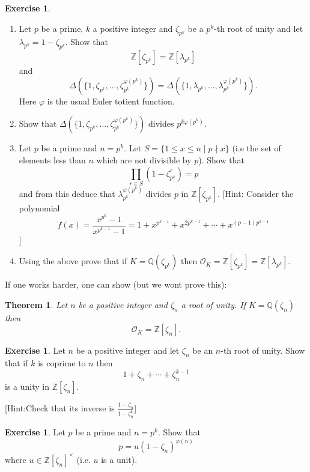 \documentclass[11pt,a4paper]{report}
\theoremstyle{plain}
\newtheorem{thm}[subsection]{Theorem}
\theoremstyle{definition}
\theoremstyle{definition}
\newtheorem{question}[subsection]{Exercise}
\newcommand{\ZZ}{\mathbb{Z}}
\def\QQ{\mathbb{Q}}
\def \lam {\lambda}
\def \OO {\mathcal{O}}
\begin{document}
	\begin{question}
		\begin{enumerate}
			\item 	Let $p$ be a prime, $k$ a positive integer and $\zeta_{p^k}$ be a $p^k$-th root of unity and let $\lam_{p^k}=1-\zeta_{p^k}$. Show that \[\ZZ[\zeta_{p^k}]=\ZZ[\lam_{p^k}] \] and \[\Delta(\{1,\zeta_{p^k},\dots,\zeta_{p^k}^{\varphi(p^k)}\})=\Delta(\{1,\lam_{p^k},\dots,\lam_{p^k}^{\varphi(p^k)}\}).\] Here $\varphi$ is the usual Euler totient function.
			
			\item Show that $\Delta(\{1,\zeta_{p^k},\dots,\zeta_{p^k}^{\varphi(p^k)}\})$ divides $p^{k\varphi(p^k)}$.
			
			\item 		Let $p$ be a prime and $n=p^k$. Let $S=\{1 \leq x \leq n \mid p\nmid x\}$ (i.e the set of elements less than $n$ which are not divisible by $p$). Show that \[\prod_{r \in S} (1-\zeta_{p^k}^r)=p\] and from this deduce that $\lam_{p^k}^{\varphi(p^k)}$ divides $p$ in $\ZZ[\zeta_{p^k}]$. [Hint: Consider the polynomial \[f(x)=\frac{x^{p^k}-1}{x^{p^{k-1}}-1}=1+x^{p^{k-1}}+x^{2p^{k-1}}+\cdots+x^{(p-1)p^{k-1}} \]]  
			
			
			
			\item Using the above prove that if $K=\QQ(\zeta_{p^k})$ then $\OO_K=\ZZ[\zeta_{p^k}]=\ZZ[\lam_{p^k}]$.
			
		\end{enumerate}
		
	\end{question}
	
	
	
	If one works harder, one can show (but we wont prove this):
	
	\begin{thm}\label{thm: ring of ints of cyclo field}
		Let $n$ be a positive integer and $\zeta_n$ a root of unity. If $K=\QQ(\zeta_n)$ then \[\OO_K=\ZZ[\zeta_n].\]
	\end{thm}
	
	\begin{question}
		Let $n$ be a positive integer and let $\zeta_n$ be an $n$-th root of unity. Show that if $k$ is coprime to $n$ then \[1+\zeta_n+\cdots+\zeta_n^{k-1}\] is a unity in $\ZZ[\zeta_n]$.
		
		[Hint:Check that its inverse is $\frac{1-\zeta_n}{1-\zeta_n^k}$] 
	\end{question}
	
	\begin{question}\label{ques: fac of p in p-th root}
		Let $p$ be a prime and $n=p^k$. Show that \[p=u(1-\zeta_n)^{\varphi(n)}\] where $u \in \ZZ[\zeta_n]^{\times}$ (i.e. $u$ is a unit).
	\end{question}
	
\end{document}

